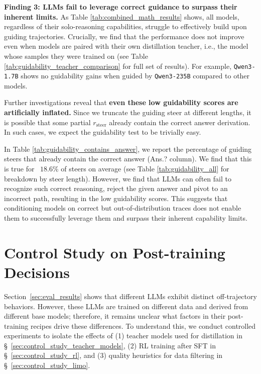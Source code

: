 \documentclass{article} %
\begin{document}
\textbf{Finding 3: LLMs fail to leverage correct guidance to surpass their inherent limits.} As Table \ref{tab:combined_math_results} shows, all models, regardless of their solo-reasoning capabilities, struggle to effectively build upon guiding trajectories. Crucially, we find that the performance does not improve even when models are paired with their own distillation teacher, i.e., the model whose samples they were trained on (see Table \ref{tab:guidability_teacher_comparison} for full set of results). For example, \texttt{Qwen3-1.7B} shows no guidability gains when guided by \texttt{Qwen3-235B} compared to other models.  

Further investigations reveal that \textbf{even these low guidability scores are artificially inflated.} Since we truncate the guiding steer at different lengths, it is possible that some partial $r_\mathrm{steer}$ already contain the correct answer derivation. In such cases, we expect the guidability test to be trivially easy. 


In Table \ref{tab:guidability_contains_answer}, we report the percentage of guiding steers that already contain the correct answer (Ans.? column). We find that this is true for ~$18.6$\% of steers on average (see Table \ref{tab:guidability_all} for breakdown by steer length). However, we find that LLMs can often fail to recognize such correct reasoning, reject the given answer and pivot to an incorrect path, resulting in the low guidability scores.  This suggests that conditioning models on correct but out-of-distribution traces does not enable them to successfully leverage them and surpass their inherent capability limits.

\section{Control Study on Post-training Decisions}
\label{sec:control_study}

Section~\ref{sec:eval_results} shows that different LLMs exhibit distinct off-trajectory behaviors. However, these LLMs are trained on different data and derived from different base models; therefore, it remains unclear what factors in their post-training recipes drive these differences. To understand this, we conduct controlled experiments to isolate the effects of (1) teacher models used for distillation in \S~\ref{sec:control_study_teacher_models}, (2) RL training after SFT in \S~\ref{sec:control_study_rl}, and (3) quality heuristics for data filtering in \S~\ref{sec:control_study_limo}.
\end{document}

